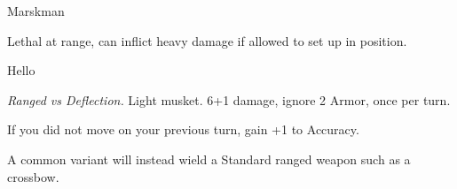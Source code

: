 \begin{monsterboxbg}{Marskman}

    Lethal at range, can inflict heavy damage if allowed to set up in position.
    
    \rpghline
    \stats[
        STR = \stat{12}, 
        DEX = \stat{10},
        CON = \stat{12},
        INT = \stat{8},
        WIS = \stat{15},
        CHA = \stat{10},
    ]
    \rpghline

    \basics[
    armorclass = 1,
    hitpoints  = 18,
    focus      = 5,
    defenses   = {Deflection 2, Reflex 2, Fortitude 2, Will -1}
    ]
    \rpghline

    \details[%
    skills = {Discretion 2},
    accuracies = {Melee 0, Ranged 5},
    ]
    \rpghline%
    \begin{rpg-monsteraction}
        Hello
    \end{rpg-monsteraction}

    

    \begin{rpg-monsteraction}
        \textit{Ranged vs Deflection.} Light musket. 6+1 damage, ignore 2 Armor, once per turn.
    \end{rpg-monsteraction}

    \begin{rpg-monsteraction}
    \end{rpg-monsteraction}


    \begin{rpg-monsteraction}[Zeroing In]
        If you did not move on your previous turn, gain +1 to Accuracy.
    \end{rpg-monsteraction}


    A common variant will instead wield a Standard ranged weapon such as a crossbow.

\end{monsterboxbg}
            





